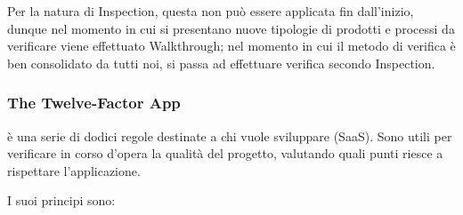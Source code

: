 			Per la natura di Inspection, questa non può essere applicata fin dall'inizio, dunque nel momento in cui si presentano nuove tipologie di
			prodotti e processi da verificare viene effettuato Walkthrough; nel momento in cui il metodo di verifica è ben consolidato da tutti noi,
			si passa ad effettuare verifica secondo Inspection.	

		\subsubsection{The Twelve-Factor App}
		 è una serie di dodici regole destinate a chi vuole sviluppare  (SaaS). Sono utili per verificare in corso d'opera la qualità del progetto, valutando quali punti riesce a rispettare l'applicazione.
		
		I suoi principi sono:
		
